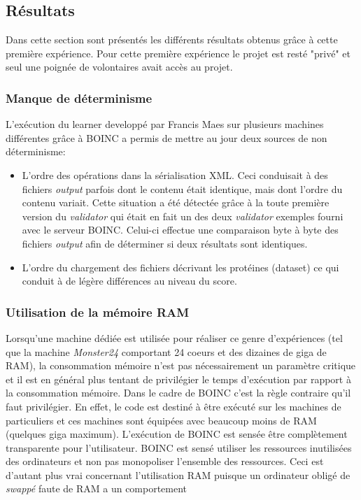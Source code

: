 \documentclass[a4paper, 11pt]{article}
\begin{document}
\subsection{Résultats}
Dans cette section sont présentés les différents résultats obtenus grâce à cette première expérience. %
Pour cette première expérience le projet est resté "privé" et seul une poignée de volontaires avait accès au projet.

\subsubsection{Manque de déterminisme}
L'exécution du learner developpé par Francis Maes sur plusieurs machines différentes grâce à \textsc{BOINC} a permis de mettre au jour deux sources de non déterminisme:
\begin{itemize}
\item L'ordre des opérations dans la sérialisation XML. Ceci conduisait à des fichiers \textit{output} parfois dont le contenu était identique, mais dont l'ordre du contenu variait. Cette situation a été détectée grâce à la toute première version du \textit{validator} qui était en fait un des deux \textit{validator} exemples fourni avec le serveur \textsc{BOINC}. Celui-ci effectue une comparaison byte à byte des fichiers \textit{output} afin de déterminer si deux résultats sont identiques.
\item L'ordre du chargement des fichiers décrivant les protéines (dataset) ce qui conduit à de légère différences au niveau du score.
\end{itemize}

\subsubsection{Utilisation de la mémoire RAM}
Lorsqu'une machine dédiée est utilisée pour réaliser ce genre d'expériences (tel que la machine \textit{Monster24} comportant 24 coeurs et des dizaines de giga de RAM), la consommation mémoire n'est pas nécessairement un paramètre critique et il est en général plus tentant de privilégier le temps d'exécution par rapport à la consommation mémoire. Dans le cadre de \textsc{BOINC} c'est la règle contraire qu'il faut privilégier. En effet, le code est destiné à être exécuté sur les machines de particuliers et ces machines sont équipées avec beaucoup moins de RAM (quelques giga maximum). L'exécution de \textsc{BOINC} est sensée être complètement transparente pour l'utilisateur. \textsc{BOINC} est sensé utiliser les ressources inutilisées des ordinateurs et non pas monopoliser l'ensemble des ressources. Ceci est d'autant plus vrai concernant l'utilisation RAM puisque un ordinateur obligé de \textit{swappé} faute de RAM a un comportement %
\end{document}

